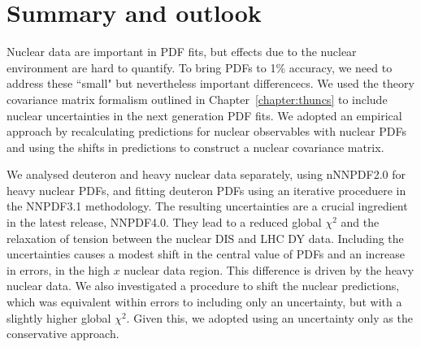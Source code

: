\section{Summary and outlook}
Nuclear data are important in PDF fits, but effects due to the nuclear environment are hard to quantify. To bring PDFs to 1\% accuracy, we need  to address these ``small" but nevertheless important differencecs. We used the theory covariance matrix formalism outlined in Chapter~\ref{chapter:thuncs} to include nuclear uncertainties in the next generation PDF fits. We adopted an empirical approach by recalculating predictions for nuclear observables with nuclear PDFs and using the shifts in predictions to construct a nuclear covariance matrix. 

We analysed deuteron and heavy nuclear data separately, using nNNPDF2.0 for heavy nuclear PDFs, and fitting deuteron PDFs using an iterative proceduere in the NNPDF3.1 methodology. The resulting uncertainties are a crucial ingredient in the latest release, NNPDF4.0. They lead to a reduced global $\chi^2$ and the relaxation of tension between the nuclear DIS and LHC DY data. Including the uncertainties causes a modest shift in the central value of PDFs and an increase in errors, in the high $x$ nuclear data region. This difference is driven by the heavy nuclear data. We also investigated a procedure to shift the nuclear predictions, which was equivalent within errors to including only an uncertainty, but with a slightly higher global $\chi^2$. Given this, we adopted using an uncertainty only as the conservative approach. 


\label{sec:summandoutlook}
